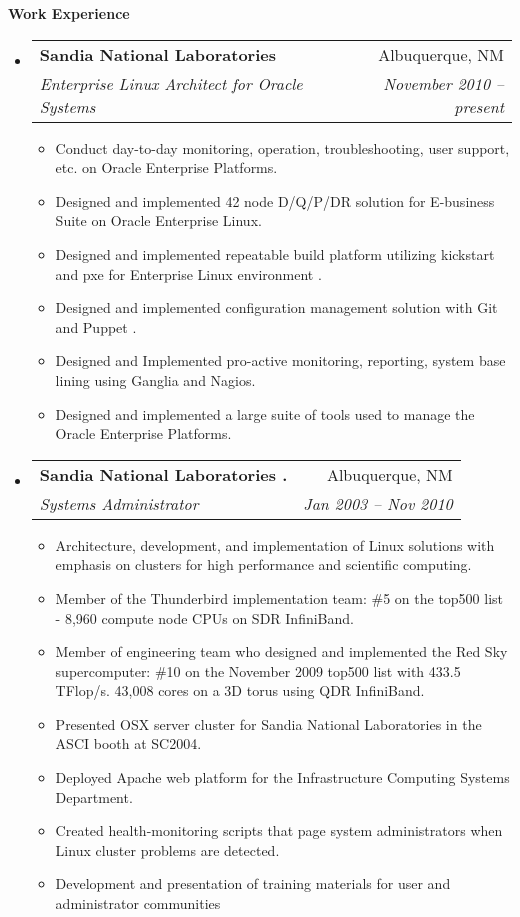 \documentclass[letterpaper,10pt]{article}
\makeatletter
\newcommand{\resitem}[1]{\item #1 \vspace{-2pt}}
\newcommand{\resheading}[1]{{\large{\colorbox{MyGrey}{\textbf{\fontfamily{phv}\selectfont #1 \vphantom{p\^{E}}}}}}}
\newcommand{\ressubheading}[4]{
\begin{tabular*}{6.5in}{l@{\extracolsep{\fill}}r}
		\textbf{#1} & #2 \\
		\textit{#3} & \textit{#4} \\
\end{tabular*}\vspace{-6pt}}
\makeatother
\begin{document}
\resheading{Work Experience}
\begin{itemize}
\item
    \ressubheading{Sandia National Laboratories}{Albuquerque, NM}{Enterprise Linux Architect for Oracle Systems }{November 2010 -- present}
    \begin{itemize}
        \resitem{Conduct day-to-day monitoring, operation, troubleshooting, user support, etc. on Oracle Enterprise Platforms.}
        \resitem{Designed and implemented 42 node D/Q/P/DR solution for E-business Suite on Oracle Enterprise Linux.}
        \resitem{Designed and implemented repeatable build platform utilizing kickstart and pxe for Enterprise Linux environment .}
         \resitem{Designed and implemented configuration management  solution with Git and Puppet .}
        \resitem{Designed and Implemented pro-active monitoring, reporting, system base lining  using Ganglia and Nagios.}
        \resitem{Designed and implemented a large suite of tools used to manage the Oracle Enterprise Platforms.}
    \end{itemize}
\item
    \ressubheading{Sandia National Laboratories .}{Albuquerque, NM}{Systems Administrator}{Jan 2003 -- Nov 2010}
    \begin{itemize}
        \resitem{Architecture, development, and implementation of Linux solutions with emphasis on clusters for high performance and scientific computing.}
        \resitem{Member of the Thunderbird implementation team: \#5 on the top500 list - 8,960 compute node CPUs on SDR InfiniBand.}

        \resitem{Member of engineering team who designed and implemented the Red Sky supercomputer: \#10 on the November 2009 top500 list with 433.5 TFlop/s. 43,008 cores on a 3D torus using QDR InfiniBand.}
        \resitem{Presented OSX server cluster for Sandia National Laboratories in the ASCI booth at SC2004.}
        \resitem{Deployed Apache web platform for the Infrastructure Computing Systems Department.}
        \resitem{Created health-monitoring scripts that page system administrators when Linux cluster problems are detected.}
        \resitem{Development and presentation of training materials for user and administrator communities}
       \end{itemize}


\end{itemize}
\end{document}

